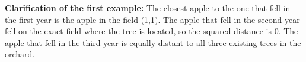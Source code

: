 {
\fontsize{10pt}{1em}
\selectfont
\textbf{Clarification of the first example:} The closest apple to the one that fell in the first year is the apple in the field (1,1). The apple that fell in the second year fell on the exact field where the tree is located, so the squared distance is 0. The apple that fell in the third year is equally distant to all three existing trees in the orchard.
}